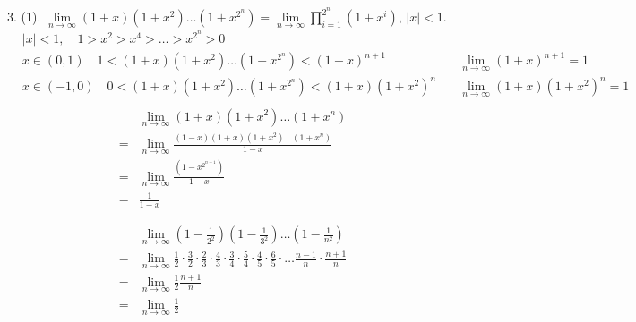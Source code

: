 3. (1).
$ \lim\limits_{n\rightarrow\infty}(1+x)(1+x^2)\dots(1+x^{2^n}) = \lim\limits_{n\rightarrow\infty}\prod_{i=1}^{2^n}(1+x^i) $, $ |x| <1 $.
	\begin{align*}
		&|x|<1,\quad 1>x^2>x^4>\dots>x^{2^n}>0&\\
		&x\in(0,1)\quad 1<(1+x)(1+x^2)\dots(1+x^{2^n})<(1+x)^{n+1}\quad &\lim_{n\rightarrow\infty}(1+x)^{n+1}=1\\
		&x\in(-1,0)\quad 0<(1+x)(1+x^2)\dots(1+x^{2^n})<(1+x)(1+x^2)^{n}\quad &\lim_{n\rightarrow\infty}(1+x)(1+x^2)^{n}=1\\
	\end{align*}
	\begin{align*}
		 &\lim_{n\rightarrow\infty} (1+x)(1+x^2)\dots(1+x^n)\\
		=&\lim_{n\rightarrow\infty} \frac{(1-x)(1+x)(1+x^2)\dots(1+x^n)}{1-x}\\
		=&\lim_{n\rightarrow\infty} \frac{(1-x^{2^{n+1}})}{1-x}\\
		=&\frac{1}{1-x}
	\end{align*}


	\begin{align*}
		&\lim_{n\rightarrow\infty}(1-\frac{1}{2^2})(1-\frac{1}{3^2})\dots(1-\frac{1}{n^2})\\
		=&\lim_{n\rightarrow\infty}
		 \frac{1}{2}\cdot\frac{3}{2}\cdot
		 \frac{2}{3}\cdot\frac{4}{3}\cdot
		 \frac{3}{4}\cdot\frac{5}{4}\cdot
		 \frac{4}{5}\cdot\frac{6}{5}\cdot
		 \dots
		 \frac{n-1}{n}\cdot\frac{n+1}{n}\\
		=&\lim_{n\rightarrow\infty}\frac{1}{2}\frac{n+1}{n}\\
		=&\lim_{n\rightarrow\infty}\frac{1}{2}		 
	\end{align*}

